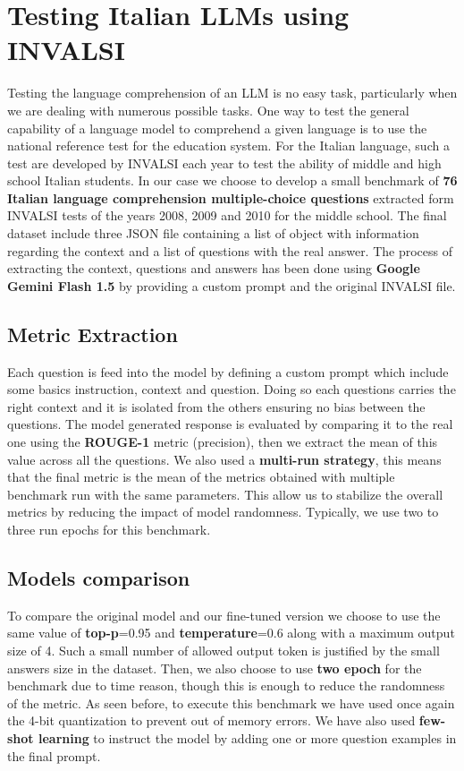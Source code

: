 \documentclass{article}
\begin{document}
		
	\section{Testing Italian LLMs using INVALSI}
	Testing the language comprehension of an LLM is no easy task, particularly when we are dealing with numerous possible tasks. One way to test the general capability of a language model to comprehend a given language is to use the national reference test for the education system. For the Italian language, such a test are developed by INVALSI each year to test the ability of middle and high school Italian students. 
	In our case we choose to develop a small benchmark of \textbf{76 Italian language comprehension multiple-choice questions} extracted form INVALSI tests of the years 2008, 2009 and 2010 for the middle school. The final dataset include three JSON file containing a list of object with information regarding the context and a list of questions with the real answer.
	The process of extracting the context, questions and answers has been done using \textbf{Google Gemini Flash 1.5} by providing a custom prompt and the original INVALSI file.  

	\subsection{Metric Extraction}
	Each question is feed into the model by defining a custom prompt which include some basics instruction, context and question.
	Doing so each questions carries the right context and it is isolated from the others ensuring no bias between the questions.
	The model generated response is evaluated by comparing it to the real one using the \textbf{ROUGE-1} metric (precision), then we extract the mean of this value across all the questions.
	We also used a \textbf{multi-run strategy}, this means that the final metric is the mean of the metrics obtained with multiple benchmark run with the same parameters. This allow us to stabilize the overall metrics by reducing the impact of model randomness. Typically, we use two to three run epochs for this benchmark. 
	
	\subsection{Models comparison}
	To compare the original model and our fine-tuned version we choose to use the same value of \textbf{top-p}=0.95 and \textbf{temperature}=0.6 along with a maximum output size of 4. Such a small number of allowed output token is justified by the small answers size in the dataset. 
	Then, we also choose to use \textbf{two epoch} for the benchmark due to time reason, though this is enough to reduce the randomness of the metric.
	As seen before, to execute this benchmark we have used once again the 4-bit quantization to prevent out of memory errors.
	We have also used \textbf{few-shot learning} to instruct the model by adding one or more question examples in the final prompt.
	
\end{document}
